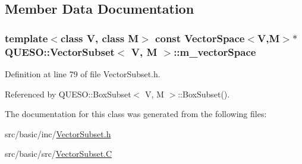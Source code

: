 \subsection{Member Data Documentation}
\hypertarget{class_q_u_e_s_o_1_1_vector_subset_a8d1bfbac8c601b407c0a6a7af0904e2f}{
\subsubsection[{m\-\_\-vector\-Space}]{\setlength{\rightskip}{0pt plus 5cm}template$<$class V, class M$>$ const {\bf Vector\-Space}$<$V,M$>$$\ast$ {\bf Q\-U\-E\-S\-O\-::\-Vector\-Subset}$<$ V, M $>$\-::m\-\_\-vector\-Space\hspace{0.3cm}{\ttfamily [protected]}}}\label{class_q_u_e_s_o_1_1_vector_subset_a8d1bfbac8c601b407c0a6a7af0904e2f}


Definition at line 79 of file Vector\-Subset.\-h.



Referenced by Q\-U\-E\-S\-O\-::\-Box\-Subset$<$ V, M $>$\-::\-Box\-Subset().



The documentation for this class was generated from the following files\-:\begin{DoxyCompactItemize}
\item 
src/basic/inc/\hyperlink{_vector_subset_8h}{Vector\-Subset.\-h}\item 
src/basic/src/\hyperlink{_vector_subset_8_c}{Vector\-Subset.\-C}\end{DoxyCompactItemize}
